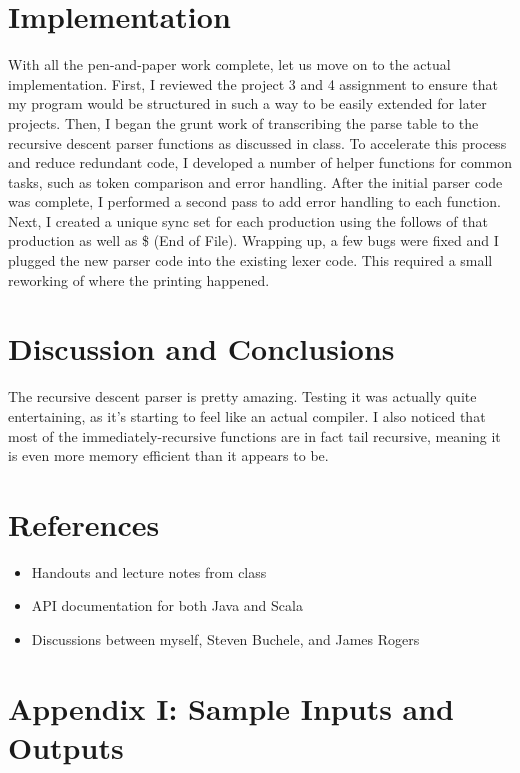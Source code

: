 \documentclass[paper=letter, fontsize=11pt, oneside, titlepage]{scrartcl}
\begin{document}
\section{Implementation}\label{impl}

With all the pen-and-paper work complete, let us move on to the actual implementation.  First, I reviewed the project 3 and 4 assignment to ensure that my program would be structured in such a way to be easily extended for later projects.  Then, I began the grunt work of transcribing the parse table to the recursive descent parser functions as discussed in class.  To accelerate this process and reduce redundant code, I developed a number of helper functions for common tasks, such as token comparison and error handling.  After the initial parser code was complete, I performed a second pass to add error handling to each function.  Next, I created a unique sync set for each production using the follows of that production as well as \$ (End of File).  Wrapping up, a few bugs were fixed and I plugged the new parser code into the existing lexer code.  This required a small reworking of where the printing happened.  

\section{Discussion and Conclusions}\label{conclusions}

The recursive descent parser is pretty amazing.  Testing it was actually quite entertaining, as it's starting to feel like an actual compiler.  I also noticed that most of the immediately-recursive functions are in fact tail recursive, meaning it is even more memory efficient than it appears to be.  

\section{References}\label{ref}

\begin{itemize}
    \item Handouts and lecture notes from class
    \item API documentation for both Java and Scala
    \item Discussions between myself, Steven Buchele, and James Rogers
\end{itemize}

\section{Appendix I: Sample Inputs and Outputs}\label{sample}
\end{document}
